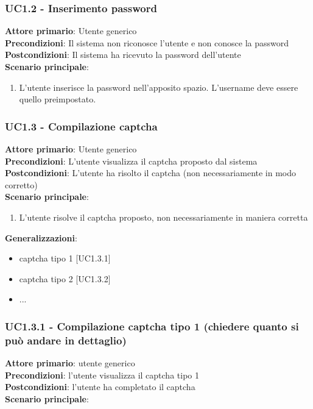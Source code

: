 \subsubsection{UC1.2 - Inserimento password}
\textbf{Attore primario}: Utente generico\\
\textbf{Precondizioni}: Il sistema non riconosce l'utente e non conosce la password\\
\textbf{Postcondizioni}: Il sistema ha ricevuto la password dell’utente\\
\textbf{Scenario principale}:
\begin{enumerate}
   \item L'utente inserisce la password nell’apposito spazio. L’username deve essere quello preimpostato.
\end{enumerate}

\subsubsection{UC1.3 - Compilazione captcha}
\textbf{Attore primario}: Utente generico\\
\textbf{Precondizioni}: L’utente visualizza il captcha proposto dal sistema\\
\textbf{Postcondizioni}: L’utente ha risolto il captcha (non necessariamente in modo corretto)\\
\textbf{Scenario principale}:
\begin{enumerate}
   \item L’utente risolve il captcha proposto, non necessariamente in maniera corretta
\end{enumerate}
\textbf{Generalizzazioni}:
\begin{itemize}
   \item captcha tipo 1 [UC1.3.1]
   \item captcha tipo 2 [UC1.3.2]
   \item ...
\end{itemize}

\subsubsection{UC1.3.1 - Compilazione captcha tipo 1 (chiedere quanto si può andare in dettaglio)}
\textbf{Attore primario}: utente generico\\
\textbf{Precondizioni}: l’utente visualizza il captcha tipo 1\\
\textbf{Postcondizioni}: l’utente ha completato il captcha\\
\textbf{Scenario principale}:

